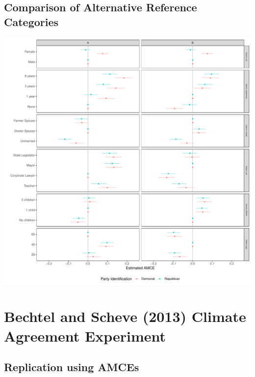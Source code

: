 \documentclass[a4paper,12pt]{article}\usepackage[]{graphicx}\usepackage[]{color}
\makeatletter
\def\maxwidth{ %
  \ifdim\Gin@nat@width>\linewidth
    \linewidth
  \else
    \Gin@nat@width
  \fi
}
\newenvironment{knitrout}{}{} %
\makeatother
\begin{document}
\clearpage


\subsection{Comparison of Alternative Reference Categories}




\begin{knitrout}
\color{fgcolor}
\includegraphics[width=\maxwidth]{figure/tkr_subgroup_example_plot-1} 

\end{knitrout}


\clearpage

\section{Bechtel and Scheve (2013) Climate Agreement Experiment}

\subsection{Replication using AMCEs}
\end{document}
